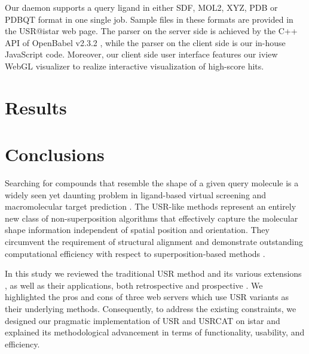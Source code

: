 Our daemon supports a query ligand in either SDF, MOL2, XYZ, PDB or PDBQT format in one single job. Sample files in these formats are provided in the USR@istar web page. The parser on the server side is achieved by the C++ API of OpenBabel v2.3.2 \citep{968}, while the parser on the client side is our in-house JavaScript code. Moreover, our client side user interface features our iview \citep{1366} WebGL visualizer to realize interactive visualization of high-score hits.

\section{Results}


\section{Conclusions}

Searching for compounds that resemble the shape of a given query molecule is a widely seen yet daunting problem in ligand-based virtual screening \citep{1332,1380,1281,1504,1502} and macromolecular target prediction \citep{1407,1408,1402}. The USR-like methods \citep{1379,1338,1331} represent an entirely new class of non-superposition algorithms that effectively capture the molecular shape information independent of spatial position and orientation. They circumvent the requirement of structural alignment and demonstrate outstanding computational efficiency with respect to superposition-based methods \citep{1440,887,1439}.

In this study we reviewed the traditional USR method \citep{1379} and its various extensions \citep{1333,1436,1437,1334,1335,1337,1338,1331,1407,1408}, as well as their applications, both retrospective \citep{1332,1331} and prospective \citep{1505,1380,1281,1504,1502}. We highlighted the pros and cons of three web servers \citep{1436,1437,1408} which use USR variants as their underlying methods. Consequently, to address the existing constraints, we designed our pragmatic implementation of USR \citep{1379} and USRCAT \citep{1331} on istar \citep{1362} and explained its methodological advancement in terms of functionality, usability, and efficiency.

